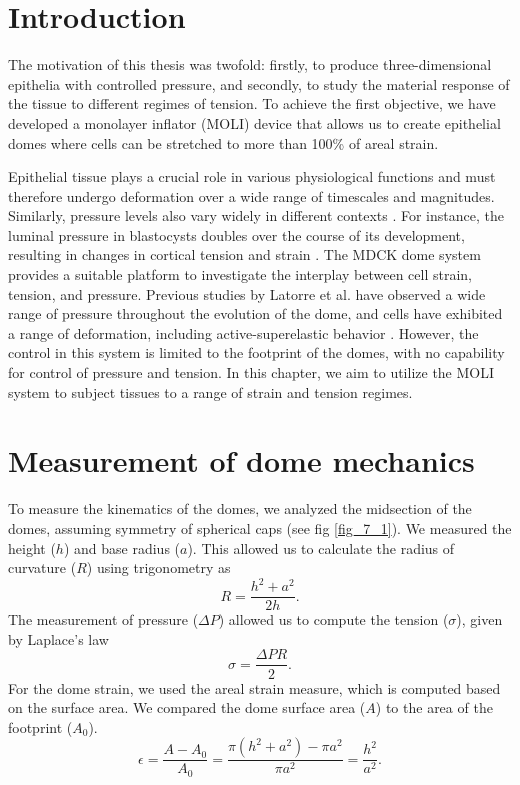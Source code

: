 \hypertarget{introduction}{%
\section{Introduction}\label{introduction2}}

The motivation of this thesis was twofold: firstly, to produce three-dimensional epithelia with controlled pressure, and secondly, to study the material response of the tissue to different regimes of tension. To achieve the first objective, we have developed a monolayer inflator (MOLI) device that allows us to create epithelial domes where cells can be stretched to more than 100\% of areal strain.

Epithelial tissue plays a crucial role in various physiological functions and must therefore undergo deformation over a wide range of timescales and magnitudes. Similarly, pressure levels also vary widely in different contexts \cite{torres-sanchez2021, choudhury2022a}. For instance, the luminal pressure in blastocysts doubles over the course of its development, resulting in changes in cortical tension and strain \cite{chan2019}. The MDCK dome system provides a suitable platform to investigate the interplay between cell strain, tension, and pressure. Previous studies by Latorre et al. have observed a wide range of pressure throughout the evolution of the dome, and cells have exhibited a range of deformation, including active-superelastic behavior \cite{latorre2018}. However, the control in this system is limited to the footprint of the domes, with no capability for control of pressure and tension. In this chapter, we aim to utilize the MOLI system to subject tissues to a range of strain and tension regimes.

\hypertarget{measurement-of-dome-mechanics}{%
	\section{Measurement of dome
		mechanics}\label{measurement-of-dome-mechanics}}


To measure the kinematics of the domes, we analyzed the midsection of the domes, assuming symmetry of spherical caps (see fig \ref{fig_7_1}). We measured the height ($h$) and base radius ($a$). This allowed us to calculate the radius of curvature ($R$) using trigonometry as 
\begin{equation}
\label{eqn:radiuscurve}
	R = \frac{h^2 + a^2}{2h}.
\end{equation}
The measurement of pressure ($\Delta P$) allowed us to compute the tension ($\sigma$), given by Laplace's law 
\begin{equation}
	\label{eqn:laplace}
	\sigma = \frac{\Delta PR }{2} .
\end{equation}
For the dome strain, we used the areal strain measure, which is computed based on the surface area. We compared the dome surface area ($A$) to the area of the footprint ($A_{0}$).
\begin{equation}
	\label{eqn:arealstrain}
\epsilon = \frac{A - A_{0}}{A_{0}} = \frac{\pi(h^2 + a^2) - \pi a^2}{\pi a^2} = \frac{h^2}{a^2} .
\end{equation}

